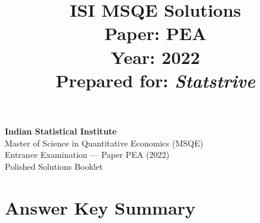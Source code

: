 \documentclass[11pt]{article}
\title{\textbf{ISI MSQE Solutions} \\[6pt] \large Paper: PEA \\[2pt] Year: 2022 \\[2pt] Prepared for: \textit{Statstrive}}
\author{}
\date{}
\begin{document}
\maketitle
\thispagestyle{empty}

\vfill
\begin{center}
\textbf{Indian Statistical Institute} \\
Master of Science in Quantitative Economics (MSQE) \\
Entrance Examination --- Paper PEA (2022) \\[6pt]
Polished Solutions Booklet
\end{center}
\vfill

\newpage

\section*{Answer Key Summary}
\end{document}
